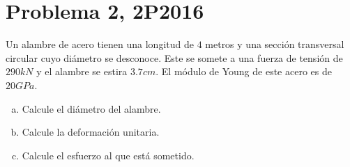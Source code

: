 \section*{Problema 2, 2P2016}


Un alambre de acero tienen una longitud de $4$ metros y una sección transversal circular cuyo diámetro se desconoce. Este se somete a una fuerza de tensión de $290kN$ y el alambre se estira $3.7cm$. El módulo de Young de este acero es de $20GPa$.
\begin{enumerate}[a)]
	\item Calcule el diámetro del alambre.
	\item Calcule la deformación unitaria.
	\item Calcule el esfuerzo al que está sometido.
\end{enumerate}







